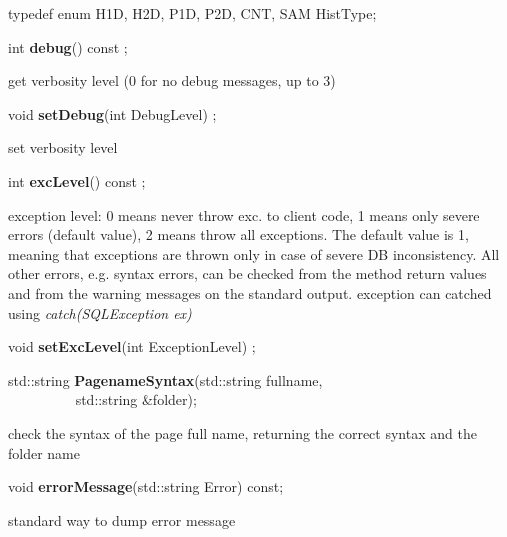 \item   typedef enum { H1D, H2D, P1D, P2D, CNT, SAM} HistType;
\item    int {\bf debug}() const ;

 get verbosity level (0 for no debug messages, up to 3)


\item    void {\bf setDebug}(int DebugLevel) ;

 set verbosity level


\item    int {\bf excLevel}() const ;

 exception level: 0 means never throw exc. to client code, 1 means only
 severe errors (default value), 2 means throw all exceptions.
 The default value is 1, meaning that exceptions are thrown only in
 case of severe DB inconsistency. All other errors, e.g. syntax errors,
 can be checked from the method return values and from the warning
 messages on the standard output.
 exception can catched using {\it catch(SQLException ex)}


\item    void {\bf setExcLevel}(int ExceptionLevel) ;




\item    std::string {\bf PagenameSyntax}(std::string fullname,\\\mbox{}~~~~~~~~~ std::string \&folder);


 check the syntax of the page full name, returning the correct syntax and the folder name 


\item    void {\bf errorMessage}(std::string Error) const; 


 standard way to dump error message


